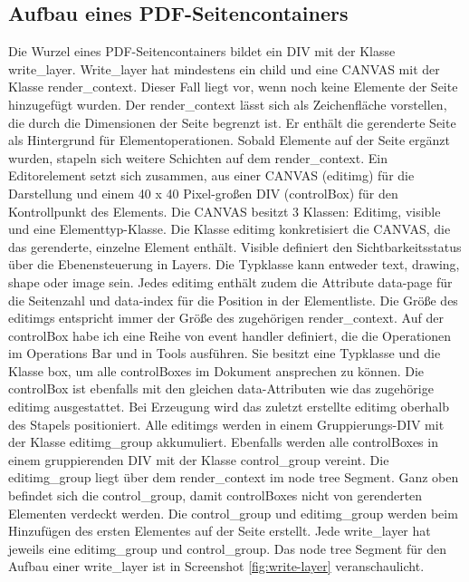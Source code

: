 \subsection{Aufbau eines PDF-Seitencontainers}
Die Wurzel eines PDF-Seitencontainers bildet ein DIV mit der Klasse write\_layer. Write\_layer hat mindestens ein child und eine CANVAS mit der Klasse render\_context. Dieser Fall liegt vor, wenn noch keine Elemente der Seite hinzugefügt wurden. Der render\_context lässt sich als Zeichenfläche vorstellen, die durch die Dimensionen der Seite begrenzt ist. Er enthält die gerenderte Seite als Hintergrund für Elementoperationen. Sobald Elemente auf der Seite ergänzt wurden, stapeln sich weitere Schichten auf dem render\_context. Ein Editorelement setzt sich zusammen, aus einer CANVAS (editimg) für die Darstellung und einem 40 x 40 Pixel-großen DIV (controlBox) für den Kontrollpunkt des Elements. Die CANVAS besitzt 3 Klassen: Editimg, visible und eine Elementtyp-Klasse. Die Klasse editimg konkretisiert die CANVAS, die das gerenderte, einzelne Element enthält. Visible definiert den Sichtbarkeitsstatus über die Ebenensteuerung in Layers. Die Typklasse kann entweder text, drawing, shape oder image sein. Jedes editimg enthält zudem die Attribute data-page für die Seitenzahl und data-index für die Position in der Elementliste. Die Größe des editimgs entspricht immer der Größe des zugehörigen render\_context. Auf der controlBox habe ich eine Reihe von event handler definiert, die die Operationen im Operations Bar und in Tools ausführen. Sie besitzt eine Typklasse und die Klasse box, um alle controlBoxes im Dokument ansprechen zu können. Die controlBox ist ebenfalls mit den gleichen data-Attributen wie das zugehörige editimg ausgestattet. Bei Erzeugung wird das zuletzt erstellte editimg oberhalb des Stapels positioniert. Alle editimgs werden in einem Gruppierungs-DIV mit der Klasse editimg\_group akkumuliert. Ebenfalls werden alle controlBoxes in einem gruppierenden DIV mit der Klasse control\_group vereint. Die editimg\_group liegt über dem render\_context im node tree Segment. Ganz oben befindet sich die control\_group, damit controlBoxes nicht von gerenderten Elementen verdeckt werden. Die control\_group und editimg\_group werden beim Hinzufügen des ersten Elementes auf der Seite erstellt. Jede write\_layer hat jeweils eine editimg\_group und control\_group. Das node tree Segment für den Aufbau einer write\_layer ist in Screenshot \ref{fig:write-layer} veranschaulicht. 

